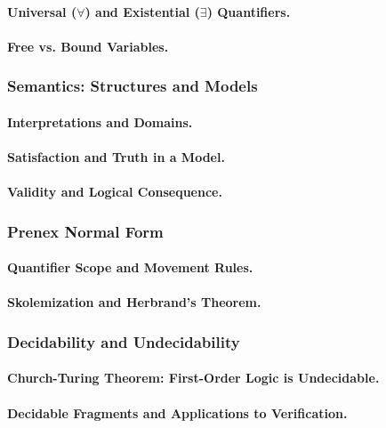 \paragraph{Universal ($\forall$) and Existential ($\exists$) Quantifiers.}
\paragraph{Free vs. Bound Variables.}

\subsubsection{Semantics: Structures and Models}
\paragraph{Interpretations and Domains.}
\paragraph{Satisfaction and Truth in a Model.}
\paragraph{Validity and Logical Consequence.}

\subsubsection{Prenex Normal Form}
\paragraph{Quantifier Scope and Movement Rules.}
\paragraph{Skolemization and Herbrand's Theorem.}

\subsubsection{Decidability and Undecidability}
\paragraph{Church-Turing Theorem: First-Order Logic is Undecidable.}
\paragraph{Decidable Fragments and Applications to Verification.}

